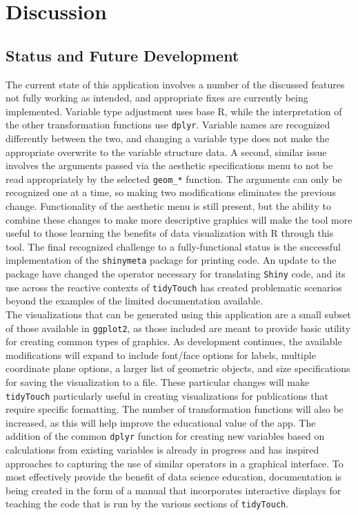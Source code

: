 \documentclass[english,man,floatsintext]{apa6}
\begin{document}
\hypertarget{discussion}{%
\section{Discussion}\label{discussion}}

\hypertarget{status-and-future-development}{%
\subsection{Status and Future Development}\label{status-and-future-development}}

The current state of this application involves a number of the discussed features not fully working as intended, and appropriate fixes are currently being implemented. Variable type adjustment uses base R, while the interpretation of the other transformation functions use \texttt{dplyr}. Variable names are recognized differently between the two, and changing a variable type does not make the appropriate overwrite to the variable structure data. A second, similar issue involves the arguments passed via the aesthetic specifications menu to not be read appropriately by the selected \texttt{geom\_*} function. The arguments can only be recognized one at a time, so making two modifications eliminates the previous change. Functionality of the aesthetic menu is still present, but the ability to combine these changes to make more descriptive graphics will make the tool more useful to those learning the benefits of data visualization with R through this tool. The final recognized challenge to a fully-functional status is the successful implementation of the \texttt{shinymeta} package for printing code. An update to the package have changed the operator necessary for translating \texttt{Shiny} code, and its use across the reactive contexts of \texttt{tidyTouch} has created problematic scenarios beyond the examples of the limited documentation available.\\
The visualizations that can be generated using this application are a small subset of those available in \texttt{ggplot2}, as those included are meant to provide basic utility for creating common types of graphics. As development continues, the available modifications will expand to include font/face options for labels, multiple coordinate plane options, a larger list of geometric objects, and size specifications for saving the visualization to a file. These particular changes will make \texttt{tidyTouch} particularly useful in creating visualizations for publications that require specific formatting. The number of transformation functions will also be increased, as this will help improve the educational value of the app. The addition of the common \texttt{dplyr} function for creating new variables based on calculations from existing variables is already in progress and has inspired approaches to capturing the use of similar operators in a graphical interface. To most effectively provide the benefit of data science education, documentation is being created in the form of a manual that incorporates interactive displays for teaching the code that is run by the various sections of \texttt{tidyTouch}.
\end{document}
